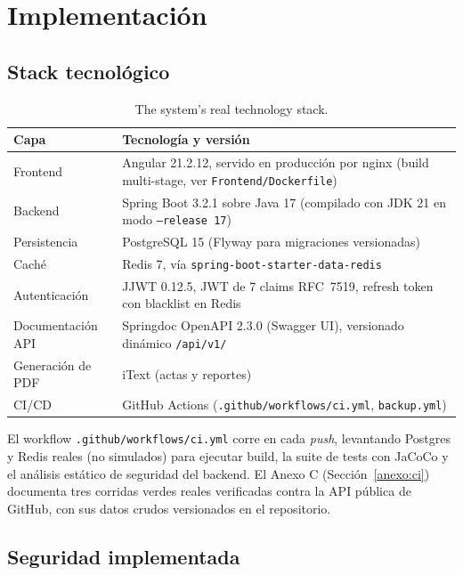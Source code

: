 \section{Implementación}
\label{sec:implementacion}

\subsection{Stack tecnológico}

\begin{table}[H]
\centering
\small
\begin{tabular}{p{3cm}p{9cm}}
\toprule
\textbf{Capa} & \textbf{Tecnología y versión} \\
\midrule
Frontend & Angular 21.2.12, servido en producción por nginx (build multi-stage, ver \texttt{Frontend/Dockerfile}) \\
Backend & Spring Boot 3.2.1 sobre Java 17 (compilado con JDK 21 en modo \texttt{--release 17}) \\
Persistencia & PostgreSQL 15 (Flyway para migraciones versionadas) \\
Caché & Redis 7, vía \texttt{spring-boot-starter-data-redis} \\
Autenticación & JJWT 0.12.5, JWT de 7 claims RFC~7519, refresh token con blacklist en Redis \\
Documentación API & Springdoc OpenAPI 2.3.0 (Swagger UI), versionado dinámico \texttt{/api/v1/} \\
Generación de PDF & iText (actas y reportes) \\
CI/CD & GitHub Actions (\texttt{.github/workflows/ci.yml}, \texttt{backup.yml}) \\
\bottomrule
\end{tabular}
\caption{The system's real technology stack.}
\end{table}

El workflow \texttt{.github/workflows/ci.yml} corre en cada \textit{push}, levantando Postgres y Redis
reales (no simulados) para ejecutar build, la suite de tests con JaCoCo y el análisis estático de
seguridad del backend. El Anexo C (Sección~\ref{anexo:ci}) documenta tres corridas verdes reales
verificadas contra la API pública de GitHub, con sus datos crudos versionados en el repositorio.

\subsection{Seguridad implementada}

